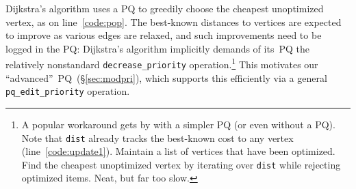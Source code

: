 
Dijkstra's algorithm uses a PQ to greedily choose the 
cheapest unoptimized vertex, as on line~\ref{code:pop}. The 
best-known distances to vertices are expected to improve as 
various edges are relaxed, and such improvements need to be logged in the PQ:
Dijkstra's algorithm implicitly demands of its~PQ the relatively 
nonstandard \texttt{decrease\_priority} 
operation.\footnote{A popular \cite{blah,blah,blah} 
workaround gets by with a simpler PQ (or even without a PQ).  
Note that \texttt{dist} already tracks the best-known cost 
to any vertex (line~\ref{code:update1}). Maintain a list of  
vertices that have been optimized. 
Find the cheapest unoptimized vertex by 
iterating over \texttt{dist} while rejecting optimized items. 
Neat, but far too slow.}
This motivates our ``advanced''~PQ~(\S\ref{sec:modpri}),
which supports this efficiently via a general \texttt{pq\_edit\_priority} operation.


